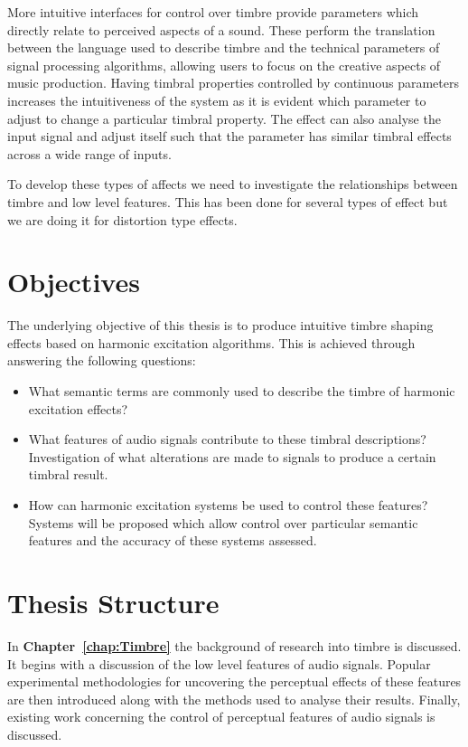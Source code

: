 	More intuitive interfaces for control over timbre provide parameters which directly relate to perceived aspects of a
	sound. These perform the translation between the language used to describe timbre and the technical parameters of
	signal processing algorithms, allowing users to focus on the creative aspects of music production. Having timbral
	properties controlled by continuous parameters increases the intuitiveness of the system as it is evident which
	parameter to adjust to change a particular timbral property. The effect can also analyse the input signal and adjust
	itself such that the parameter has similar timbral effects across a wide range of inputs.

	\note
	{
		To develop these types of affects we need to investigate the relationships between timbre and low level
		features. This has been done for several types of effect but we are doing it for distortion type effects.
	}

\section{Objectives}
\label{sec:Introduction-Objectives}
	The underlying objective of this thesis is to produce intuitive timbre shaping effects based on harmonic excitation
	algorithms. This is achieved through answering the following questions:

	\begin{itemize}
		\item What semantic terms are commonly used to describe the timbre of harmonic excitation effects? 
		\item What features of audio signals contribute to these timbral descriptions? Investigation of what
		      alterations are made to signals to produce a certain timbral result.
		\item How can harmonic excitation systems be used to control these features? Systems will be proposed which
		      allow control over particular semantic features and the accuracy of these systems assessed.
	\end{itemize}

\section{Thesis Structure}
\label{sec:Introduction-ThesisStructure}
	In {\bf{Chapter~\ref{chap:Timbre}}} the background of research into timbre is discussed. It begins with a discussion
	of the low level features of audio signals. Popular experimental methodologies for uncovering the perceptual effects
	of these features are then introduced along with the methods used to analyse their results. Finally, existing work
	concerning the control of perceptual features of audio signals is discussed.

